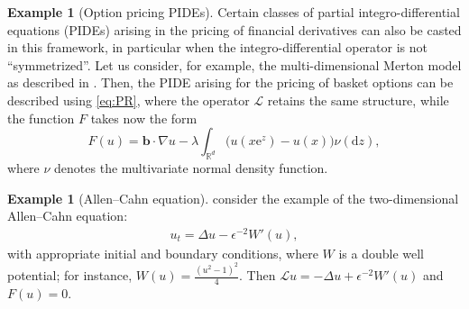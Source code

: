 \documentclass[11pt,a4paper,reqno]{amsart}
\numberwithin{equation}{section}
\theoremstyle{plain}
\theoremstyle{definition}
\newtheorem{example}[theorem]{Example}
\def\ud{\mathrm d}
\def\ue{\mathrm e}
\newcommand{\R}{\mathbb{R}}
\begin{document}
\begin{example}[Option pricing PIDEs]
\label{ex:op-PIDE}
Certain classes of partial integro-differential equations (PIDEs) arising in the pricing of financial derivatives can also be casted in this framework, in particular when the integro-differential operator is not ``symmetrized''.
Let us consider, for example, the multi-dimensional Merton model as described in \citet{georgoulis2024deep}.
Then, the PIDE arising for the pricing of basket options can be described using \eqref{eq:PR}, where the operator $\mathcal{L}$ retains the same structure, while the function $F$ takes now the form
\[
    F(u) = \mathbf{b} \cdot \nabla u - \lambda \int_{\R^d} \big( u \left( x \ue^z \right) - u (x) \big) \nu(\ud z),
\]
where $\nu$ denotes the multivariate normal density function.
\end{example}

\begin{example}[Allen--Cahn equation]
\citet{park2023deep} consider the example of the two-dimensional Allen--Cahn equation:
\[
\begin{aligned}
u_t  = \Delta u - \epsilon^{-2} W'(u), 
\end{aligned}
\]
with appropriate initial and boundary conditions, where $W$ is a double well potential; for instance, $W(u) = \frac{(u^2 -1 )^2}{4}$. 
Then $\mathcal{L}u = - \Delta u + \epsilon^{-2} W'(u)$ and $F(u) = 0$.
\end{example}

\end{document}
